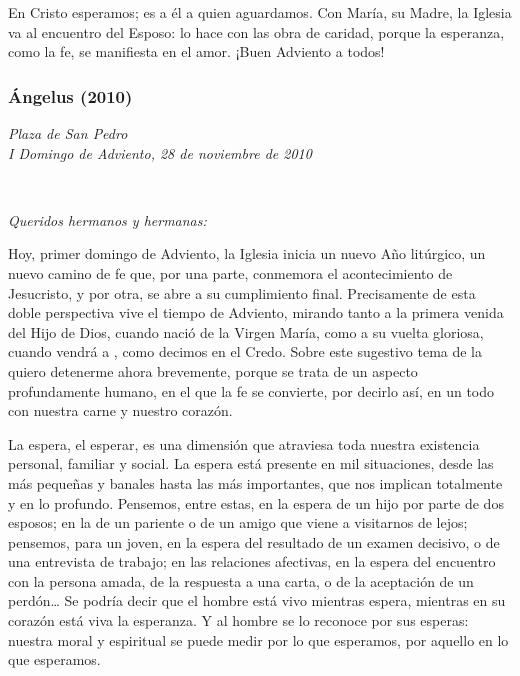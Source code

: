En Cristo esperamos; es a él a quien aguardamos. Con María, su Madre, la Iglesia va al encuentro del Esposo: lo hace con las obra de caridad, porque la esperanza, como la fe, se manifiesta en el amor. ¡Buen Adviento a todos!

\subsubsection{Ángelus (2010)} \emph{Plaza de San Pedro\\ I Domingo de Adviento, 28 de noviembre de 2010}


~

\emph{Queridos hermanos y hermanas:}

Hoy, primer domingo de Adviento, la Iglesia inicia un nuevo Año litúrgico, un nuevo camino de fe que, por una parte, conmemora el acontecimiento de Jesucristo, y por otra, se abre a su cumplimiento final. Precisamente de esta doble perspectiva vive el tiempo de Adviento, mirando tanto a la primera venida del Hijo de Dios, cuando nació de la Virgen María, como a su vuelta gloriosa, cuando vendrá a , como decimos en el Credo. Sobre este sugestivo tema de la  quiero detenerme ahora brevemente, porque se trata de un aspecto profundamente humano, en el que la fe se convierte, por decirlo así, en un todo con nuestra carne y nuestro corazón.

La espera, el esperar, es una dimensión que atraviesa toda nuestra existencia personal, familiar y social. La espera está presente en mil situaciones, desde las más pequeñas y banales hasta las más importantes, que nos implican totalmente y en lo profundo. Pensemos, entre estas, en la espera de un hijo por parte de dos esposos; en la de un pariente o de un amigo que viene a visitarnos de lejos; pensemos, para un joven, en la espera del resultado de un examen decisivo, o de una entrevista de trabajo; en las relaciones afectivas, en la espera del encuentro con la persona amada, de la respuesta a una carta, o de la aceptación de un perdón\ldots{} Se podría decir que el hombre está vivo mientras espera, mientras en su corazón está viva la esperanza. Y al hombre se lo reconoce por sus esperas: nuestra  moral y espiritual se puede medir por lo que esperamos, por aquello en lo que esperamos.

